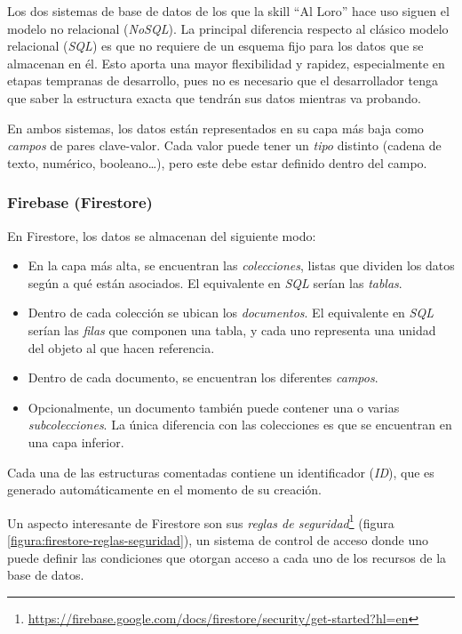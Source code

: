 \documentclass[11pt,spanish,listoffigures,listoftables,table,hyphens,dvipsnames]{tfgetsinf}
\begin{document}
Los dos sistemas de base de datos de los que la skill ``Al Loro'' hace uso siguen el modelo no relacional (\emph{NoSQL}). La principal diferencia respecto al clásico modelo relacional (\emph{SQL}) es que no requiere de un esquema fijo para los datos que se almacenan en él. Esto aporta una mayor flexibilidad y rapidez, especialmente en etapas tempranas de desarrollo, pues no es necesario que el desarrollador tenga que saber la estructura exacta que tendrán sus datos mientras va probando.

En ambos sistemas, los datos están representados en su capa más baja como \emph{campos} de pares clave-valor. Cada valor puede tener un \emph{tipo} distinto (cadena de texto, numérico, booleano\dots), pero este debe estar definido dentro del campo.

\subsubsection{Firebase (Firestore)}

En Firestore, los datos se almacenan del siguiente modo:

\begin{itemize}
   \item En la capa más alta, se encuentran las \emph{colecciones}, listas que dividen los datos según a qué están asociados. El equivalente en \emph{SQL} serían las \emph{tablas}.
   \item Dentro de cada colección se ubican los \emph{documentos}. El equivalente en \emph{SQL} serían las \emph{filas} que componen una tabla, y cada uno representa una unidad del objeto al que hacen referencia.
   \item Dentro de cada documento, se encuentran los diferentes \emph{campos}. 
   \item Opcionalmente, un documento también puede contener una o varias \emph{subcolecciones}. La única diferencia con las colecciones es que se encuentran en una capa inferior.
\end{itemize}

Cada una de las estructuras comentadas contiene un identificador (\emph{ID}), que es generado automáticamente en el momento de su creación.

Un aspecto interesante de Firestore son sus \emph{reglas de seguridad}\footnote{\url{https://firebase.google.com/docs/firestore/security/get-started?hl=en}} (figura \ref{figura:firestore-reglas-seguridad}), un sistema de control de acceso donde uno puede definir las condiciones que otorgan acceso a cada uno de los recursos de la base de datos.
\end{document}
